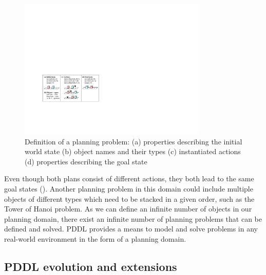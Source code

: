 \begin{figure}[h]
	\centering
	\includegraphics[width=0.8\textwidth]{figures/planning-permutation}
	\caption{Definition of a planning problem: (a) properties describing the initial world state (b) object names and their types (c) instantiated actions (d) properties describing the goal state}
	\label{fig:planning problem}
\end{figure}

Even though both plans consist of different actions, they both lead to the same goal states ().
Another planning problem in this domain could include multiple objects of different types which need to be stacked in a given order, such as the Tower of Hanoi problem.
As we can define an infinite number of objects in our planning domain, there exist an infinite number of planning problems that can be defined and solved. 
PDDL provides a means to model and solve problems in any real-world environment in the form of a planning domain. 


\subsection{PDDL evolution and extensions}\label{subsec:PDDL evolution}

